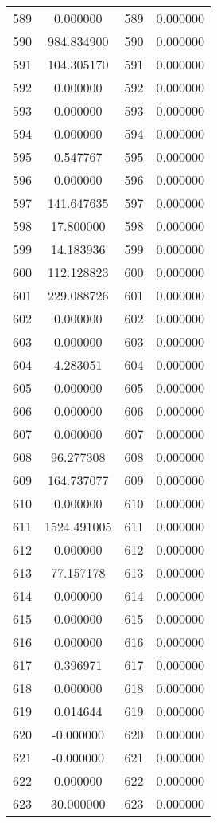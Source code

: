 \documentclass[12pt]{article}
\begin{document}
\begin{longtable}{@{}cccc@{}}
589 & 0.000000 & 589 & 0.000000 \\
590 & 984.834900 & 590 & 0.000000 \\
591 & 104.305170 & 591 & 0.000000 \\
592 & 0.000000 & 592 & 0.000000 \\
593 & 0.000000 & 593 & 0.000000 \\
594 & 0.000000 & 594 & 0.000000 \\
595 & 0.547767 & 595 & 0.000000 \\
596 & 0.000000 & 596 & 0.000000 \\
597 & 141.647635 & 597 & 0.000000 \\
598 & 17.800000 & 598 & 0.000000 \\
599 & 14.183936 & 599 & 0.000000 \\
600 & 112.128823 & 600 & 0.000000 \\
601 & 229.088726 & 601 & 0.000000 \\
602 & 0.000000 & 602 & 0.000000 \\
603 & 0.000000 & 603 & 0.000000 \\
604 & 4.283051 & 604 & 0.000000 \\
605 & 0.000000 & 605 & 0.000000 \\
606 & 0.000000 & 606 & 0.000000 \\
607 & 0.000000 & 607 & 0.000000 \\
608 & 96.277308 & 608 & 0.000000 \\
609 & 164.737077 & 609 & 0.000000 \\
610 & 0.000000 & 610 & 0.000000 \\
611 & 1524.491005 & 611 & 0.000000 \\
612 & 0.000000 & 612 & 0.000000 \\
613 & 77.157178 & 613 & 0.000000 \\
614 & 0.000000 & 614 & 0.000000 \\
615 & 0.000000 & 615 & 0.000000 \\
616 & 0.000000 & 616 & 0.000000 \\
617 & 0.396971 & 617 & 0.000000 \\
618 & 0.000000 & 618 & 0.000000 \\
619 & 0.014644 & 619 & 0.000000 \\
620 & -0.000000 & 620 & 0.000000 \\
621 & -0.000000 & 621 & 0.000000 \\
622 & 0.000000 & 622 & 0.000000 \\
623 & 30.000000 & 623 & 0.000000 \\

\end{longtable}
\end{document}
